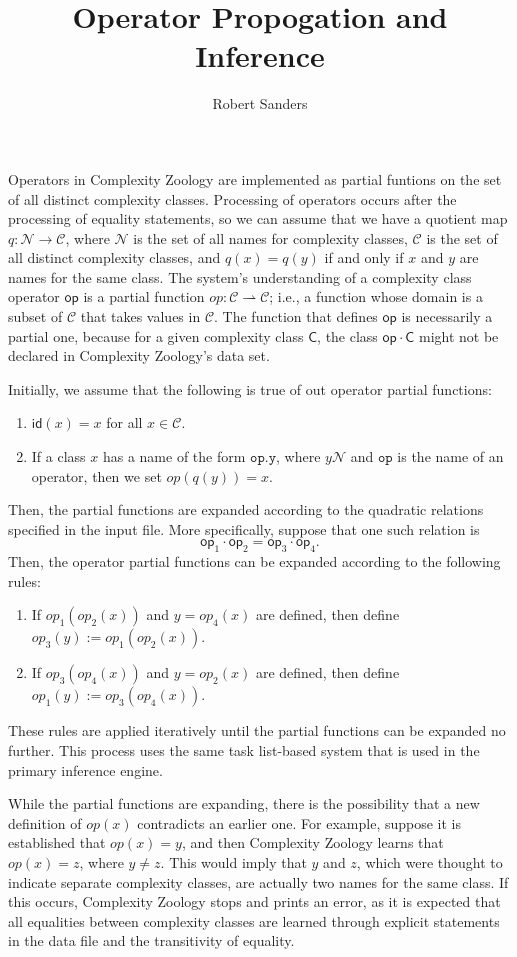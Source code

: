 \documentclass[12pt]{amsart}
\title{Operator Propogation and Inference}
\date{}
\author{Robert Sanders}
\theoremstyle{definition}
\theoremstyle{remark}
\newcommand{\sC}{\mathsf{C}}
\newcommand{\msf}[1]{\mathsf{#1}}
\newcommand{\id}{\msf{id}}
\newcommand{\op}{\msf{op}}
\newcommand{\cC}{\mathcal{C}}
\newcommand{\cN}{\mathcal{N}}
\begin{document}
\maketitle

Operators in Complexity Zoology are implemented as partial funtions on the set
of all distinct complexity classes. Processing of operators occurs after the
processing of equality statements, so we can assume that we have a quotient map
$q:\cN\rightarrow\cC$, where $\cN$ is the set of all names for complexity
classes, $\cC$ is the set of all distinct complexity classes, and $q(x)=q(y)$ if
and only if $x$ and $y$ are names for the same class. The system's understanding
of a complexity class operator $\op$ is a partial function
$op:\cC\rightharpoonup\cC$; i.e., a function whose domain is a subset of $\cC$
that takes values in $\cC$. The function that defines $\op$ is necessarily a
partial one, because for a given complexity class $\sC$, the class $\op\cdot\sC$
might not be declared in Complexity Zoology's data set.

Initially, we assume that the following is true of out operator partial
functions:
\begin{enumerate}
\item $\id(x)=x$ for all $x\in\cC$.
\item If a class $x$ has a name of the form $\mathtt{op.y}$, where $y\cN$ and
  $\mathtt{op}$ is the name of an operator, then we set $op(q(y))=x$.
\end{enumerate}
Then, the partial functions are expanded according to the quadratic relations
specified in the input file. More specifically, suppose that one such relation
is
\[
\op_1\cdot\op_2=\op_3\cdot\op_4.
\]
Then, the operator partial functions can be expanded according to the following
rules:
\begin{enumerate}
\item If $op_1(op_2(x))$ and $y=op_4(x)$ are defined, then define
  $op_3(y):=op_1(op_2(x))$.
\item If $op_3(op_4(x))$ and $y=op_2(x)$ are defined, then define
  $op_1(y):=op_3(op_4(x))$.
\end{enumerate}
These rules are applied iteratively until the partial functions can be expanded
no further. This process uses the same task list-based system that is used in
the primary inference engine.

While the partial functions are expanding, there is the possibility that a new
definition of $op(x)$ contradicts an earlier one. For example, suppose it is
established that $op(x)=y$, and then Complexity Zoology learns that $op(x)=z$,
where $y\neq z$. This would imply that $y$ and $z$, which were thought to
indicate separate complexity classes, are actually two names for the same
class. If this occurs, Complexity Zoology stops and prints an error, as it is
expected that all equalities between complexity classes are learned through
explicit statements in the data file and the transitivity of equality.
\end{document}
